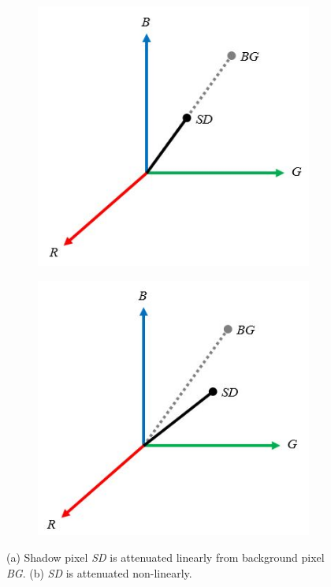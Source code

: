 \begin{figure}
  \centering
  \begin{subfigure}{.49\linewidth}
  	\includegraphics[width=1\linewidth]{figures/rgb_linear_atten.jpg}
  	\caption{}
  \end{subfigure}
  \hfill
  \begin{subfigure}{.49\linewidth}
  	\includegraphics[width=1\linewidth]{figures/rgb_nonlinear_atten.jpg}
  	\caption{}
  \end{subfigure}
 
\caption{(a) Shadow pixel \textit{SD} is attenuated linearly from background pixel \textit{BG}. (b) \textit{SD} is attenuated non-linearly.}
  \label{fig:rgbcube}
\end{figure}


